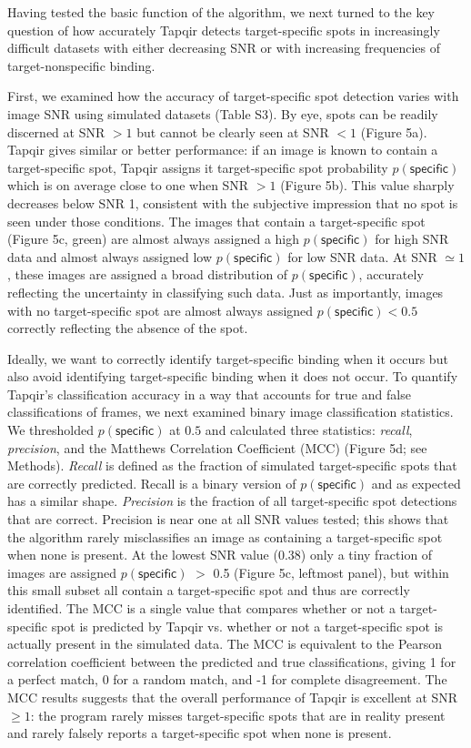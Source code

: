 Having tested the basic function of the algorithm, we next turned to the key question of how accurately Tapqir detects target-specific spots in increasingly difficult datasets with either decreasing SNR or with increasing frequencies of target-nonspecific binding.  

First, we examined how the accuracy of target-specific spot detection varies with  image SNR using simulated datasets (Table S3). By eye, spots can be readily discerned at SNR $>1$ but cannot be clearly seen at SNR $<1$ (Figure 5a). Tapqir gives similar or better performance:  if an image is known to contain a target-specific spot, Tapqir assigns it target-specific spot probability $p(\mathsf{specific})$ which is on average close to  one when SNR $>1$ (Figure 5b).  This value sharply decreases below SNR 1, consistent with the subjective impression that no spot is seen under those conditions.  The images that contain a target-specific spot (Figure 5c, green) are almost always assigned a high $p(\mathsf{specific})$ for high SNR data and almost always assigned low $p(\mathsf{specific})$ for low SNR data.  At SNR $\simeq 1$, these images are assigned a broad distribution of $p(\mathsf{specific})$, accurately reflecting the uncertainty in classifying such data.  Just as importantly, images with no target-specific spot are almost always assigned $p(\mathsf{specific}) < 0.5$ correctly reflecting the absence of the spot.

Ideally, we want to correctly identify target-specific binding when it occurs but also avoid identifying target-specific binding when it does not occur. To quantify Tapqir's classification accuracy in a way that accounts for true and false classifications of frames, we next examined binary image classification statistics. We thresholded $p(\mathsf{specific})$ at $0.5$ and calculated three statistics: \textit{recall}, \textit{precision}, and the Matthews Correlation Coefficient (MCC) \cite{Matthews1975-rw} (Figure 5d; see Methods). \textit{Recall} is defined as the fraction of simulated target-specific spots that are correctly predicted. Recall is a binary version of $p(\mathsf{specific})$ and as expected has a similar shape. \textit{Precision} is the fraction of all target-specific spot detections that are correct. Precision is near one at all SNR values tested; this shows that the algorithm rarely misclassifies an image as containing a target-specific spot when none is present. At the lowest SNR value (0.38) only a tiny fraction of images are assigned $p(\mathsf{specific})$ $>$ 0.5 (Figure 5c, leftmost panel), but within this small subset all contain a target-specific spot and thus are correctly identified. The MCC is a single value that compares whether or not a target-specific spot is predicted by Tapqir vs. whether or not a target-specific spot is actually present in the simulated data.  The MCC is equivalent to the Pearson correlation coefficient between the predicted and true classifications, giving 1 for a perfect match, 0 for a random match, and -1 for complete disagreement. The MCC results suggests that the overall performance of Tapqir is excellent at SNR $\ge 1$: the program rarely misses target-specific spots that are in reality present and rarely falsely reports a target-specific spot when none is present.  


